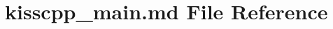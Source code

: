 \hypertarget{kisscpp__main_8md}{\section{kisscpp\-\_\-main.\-md File Reference}
\label{kisscpp__main_8md}
}
